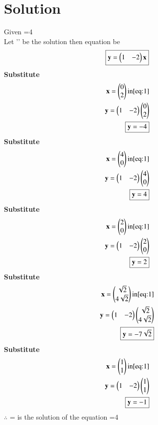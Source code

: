 \documentclass[journal,12pt,twocolumn]{IEEEtran}
\begin{document}
\section{Solution}
Given 
=4\\
Let '' be the solution then equation be 
\begin{equation} \label{eq:1}
\boxed{\mathbf{y}=\begin{pmatrix}1&-2\end{pmatrix}\mathbf{x}}
\end{equation}
\textbf{Substitute}
\begin{align}
 \mathbf{x}=\begin{pmatrix}0\\2\end{pmatrix}\text{in} \eqref{eq:1}\\
          \mathbf{y}=\begin{pmatrix}1&-2\end{pmatrix}\begin{pmatrix}0\\2\end{pmatrix}\\
          \boxed{\mathbf{y}=-4}
\end{align}
\textbf{Substitute }
\begin{align}
\mathbf{x}=\begin{pmatrix}4\\0\end{pmatrix}\text{in} \eqref{eq:1}\\
          \mathbf{y}=\begin{pmatrix}1&-2\end{pmatrix}\begin{pmatrix}4\\0\end{pmatrix}\\
          \boxed{\mathbf{y}=4}
\end{align}
\textbf{Substitute}
\begin{align}
 \mathbf{x}=\begin{pmatrix}2\\0\end{pmatrix}\text{in} \eqref{eq:1}\\
          \mathbf{y}=\begin{pmatrix}1&-2\end{pmatrix}\begin{pmatrix}2\\0\end{pmatrix}\\
          \boxed{\mathbf{y}=2}   
\end{align}
\textbf{Substitute}
\begin{align}
\mathbf{x}=\begin{pmatrix}\sqrt{2}\\4\sqrt{2}\end{pmatrix}\text{in} \eqref{eq:1}\\
          \mathbf{y}=\begin{pmatrix}1&-2\end{pmatrix}\begin{pmatrix}\sqrt{2}\\4\sqrt{2}\end{pmatrix}\\
          \boxed{\mathbf{y}=-7\sqrt{2}}    
\end{align}
\textbf{Substitute} 
\begin{align}
\mathbf{x}=\begin{pmatrix}1\\1\end{pmatrix}\text{in} \eqref{eq:1}\\
          \mathbf{y}=\begin{pmatrix}1&-2\end{pmatrix}\begin{pmatrix}1\\1\end{pmatrix}\\
          \boxed{\mathbf{y}=-1}
\end{align}
$\therefore$ 
= is the solution of the equation =4
\end{document}

